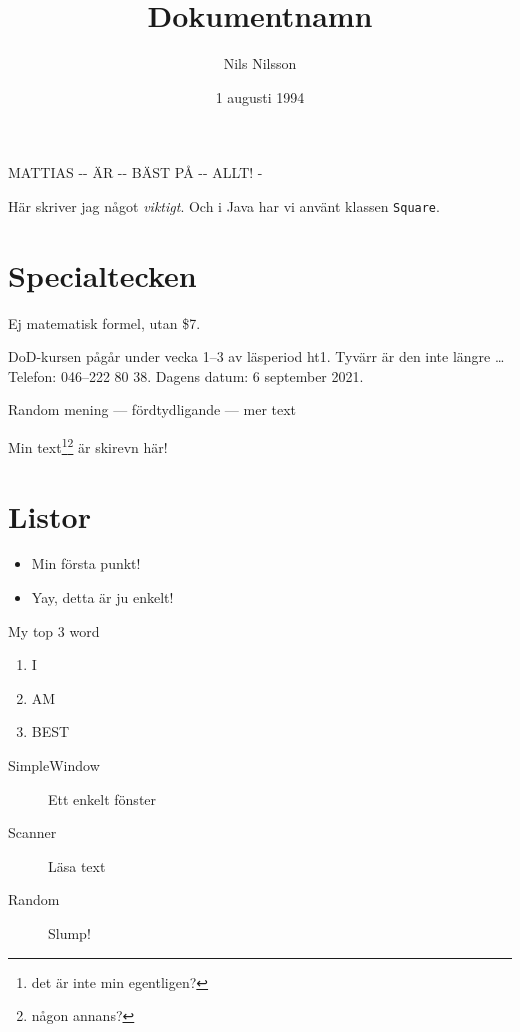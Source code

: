 \documentclass[a4paper]{article}
\title{Dokumentnamn}
\author{Nils Nilsson}
\date{1 augusti 1994}        %
\begin{document}

\maketitle                   %


MATTIAS \--\-- ÄR  -{}- BÄST PÅ -\-- ALLT! \--

Här skriver jag något \emph{viktigt}. Och i
Java har vi använt klassen \texttt{Square}.

\section{Specialtecken}

Ej matematisk formel, utan \$7.



DoD-kursen pågår under vecka
1--3 av läsperiod ht1. Tyvärr 
är den inte längre \ldots
Telefon: 046--222 80 38. Dagens
datum: 6 september 2021.

Random mening --- fördtydligande --- mer text 


Min text\footnote{det är inte min egentligen?}\footnote{någon annans?} är skirevn här!


\section{Listor}


\begin{itemize}
	\item Min första punkt!
	\item Yay, detta är ju enkelt!
\end{itemize}

My top 3 word
\begin{enumerate}
	\item I
	\item AM
	\item BEST
\end{enumerate}

\begin{description}
	\item [SimpleWindow] Ett enkelt fönster
	\item [Scanner] Läsa text
	\item [Random] Slump!
\end{description}
\end{document}

